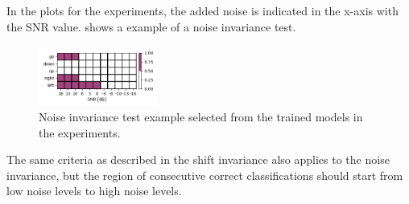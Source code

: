 \FloatBarrier
\noindent
In the plots for the experiments, the added noise is indicated in the x-axis with the SNR value.
 shows a example of a noise invariance test.
\begin{figure}[!ht]
  \centering
    \includegraphics[width=0.35\textwidth]{./5_exp/figs/exp_fs_cepstral_tb_noise_conv-jim_mfcc12_norm0}
  \caption{Noise invariance test example selected from the trained models in the experiments.}
  \label{fig:exp_details_tb_noise}
\end{figure}
\FloatBarrier
\noindent
The same criteria as described in the shift invariance also applies to the noise invariance, but the region of consecutive correct classifications should start from low noise levels to high noise levels.